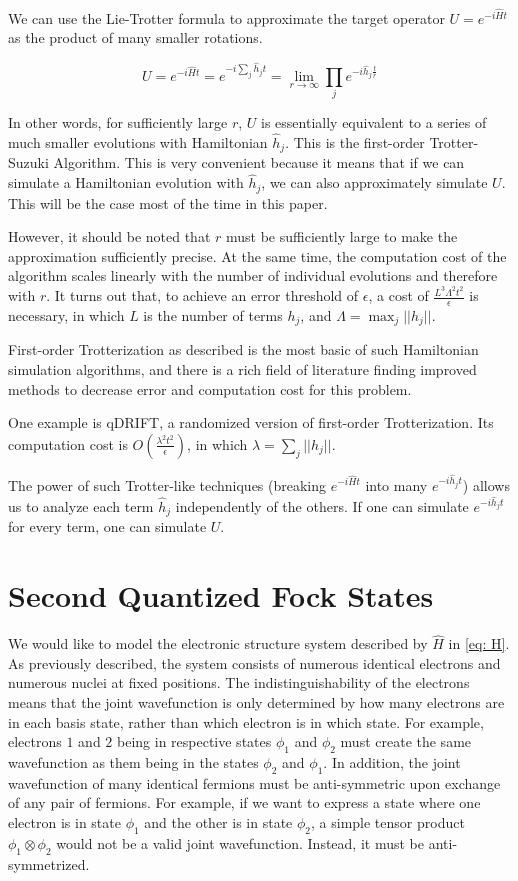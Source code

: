 We can use the Lie-Trotter formula to approximate the target operator $U = e^{-i\hat{H}t}$ as the product of many smaller rotations.

\begin{equation}
    U = e^{-i\hat{H}t} = e^{-i\sum_j \hat{h}_jt} = \lim_{r \rightarrow \infty} \prod_j e^{-i\hat{h}_j\frac{t}{r}}
\end{equation}

In other words, for sufficiently large $r$, $U$ is essentially equivalent to a series of much smaller evolutions with Hamiltonian $\hat{h}_j$. This is the first-order Trotter-Suzuki Algorithm. This is very convenient because it means that if we can simulate a Hamiltonian evolution with $\hat{h}_j$, we can also approximately simulate $U$. This will be the case most of the time in this paper.

However, it should be noted that $r$ must be sufficiently large to make the approximation sufficiently precise. At the same time, the computation cost of the algorithm scales linearly with the number of individual evolutions and therefore with $r$. It turns out that, to achieve an error threshold of $\epsilon$, a cost of $\frac{L^3\Lambda^2t^2}{\epsilon}$ is necessary, in which $L$ is the number of terms $h_j$, and $\Lambda = \max_j ||h_j||$.

First-order Trotterization as described is the most basic of such Hamiltonian simulation algorithms, and there is a rich field of literature finding improved methods to decrease error and computation cost for this problem.

One example is qDRIFT, a randomized version of first-order Trotterization. Its computation cost is $O(\frac{\lambda^2 t^2}{\epsilon})$, in which $\lambda = \sum_j ||h_j||$.

The power of such Trotter-like techniques (breaking $e^{-i\hat{H}t}$ into many $e^{-i\hat{h}_jt}$) allows us to analyze each term $\hat{h}_j$ independently of the others. If one can simulate $e^{-i\hat{h}_jt}$ for every term, one can simulate $U$.

\section{Second Quantized Fock States}

We would like to model the electronic structure system described by $\hat{H}$ in \eqref{eq: H}. As previously described, the system consists of numerous identical electrons and numerous nuclei at fixed positions. The indistinguishability of the electrons means that the joint wavefunction is only determined by how many electrons are in each basis state, rather than which electron is in which state. For example, electrons $1$ and $2$ being in respective states $\phi_1$ and $\phi_2$ must create the same wavefunction as them being in the states $\phi_2$ and $\phi_1$. In addition, the joint wavefunction of many identical fermions must be anti-symmetric upon exchange of any pair of fermions. For example, if we want to express a state where one electron is in state $\phi_1$ and the other is in state $\phi_2$, a simple tensor product $\phi_1 \otimes \phi_2$ would not be a valid joint wavefunction. Instead, it must be anti-symmetrized.

